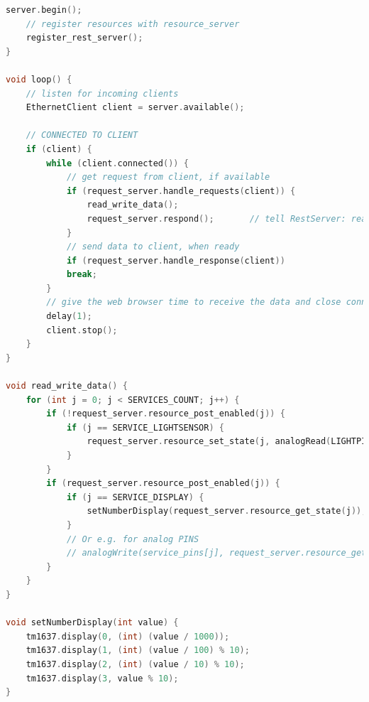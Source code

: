 \begin{lstlisting}[language=C]
	server.begin();	
	// register resources with resource_server
	register_rest_server();
}

void loop() {
	// listen for incoming clients
	EthernetClient client = server.available();
	
	// CONNECTED TO CLIENT
	if (client) {
		while (client.connected()) {			
			// get request from client, if available
			if (request_server.handle_requests(client)) {
				read_write_data();
				request_server.respond();       // tell RestServer: ready to respond
			}			
			// send data to client, when ready      
			if (request_server.handle_response(client))
			break;
		}
		// give the web browser time to receive the data and close connection
		delay(1);
		client.stop();
	}
}

void read_write_data() {
	for (int j = 0; j < SERVICES_COUNT; j++) {
		if (!request_server.resource_post_enabled(j)) {
			if (j == SERVICE_LIGHTSENSOR) {
				request_server.resource_set_state(j, analogRead(LIGHTPIN));
			}
		}
		if (request_server.resource_post_enabled(j)) {
			if (j == SERVICE_DISPLAY) {
				setNumberDisplay(request_server.resource_get_state(j));
			}
			// Or e.g. for analog PINS
			// analogWrite(service_pins[j], request_server.resource_get_state(j));
		}
	}
}

void setNumberDisplay(int value) {
	tm1637.display(0, (int) (value / 1000));
	tm1637.display(1, (int) (value / 100) % 10);
	tm1637.display(2, (int) (value / 10) % 10);
	tm1637.display(3, value % 10);
}
\end{lstlisting}



